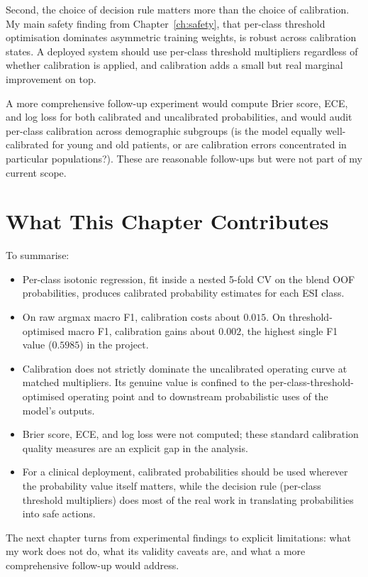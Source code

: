 Second, the choice of decision rule matters more than the choice of calibration. My main safety finding from Chapter~\ref{ch:safety}, that per-class threshold optimisation dominates asymmetric training weights, is robust across calibration states. A deployed system should use per-class threshold multipliers regardless of whether calibration is applied, and calibration adds a small but real marginal improvement on top.

A more comprehensive follow-up experiment would compute Brier score, ECE, and log loss for both calibrated and uncalibrated probabilities, and would audit per-class calibration across demographic subgroups (is the model equally well-calibrated for young and old patients, or are calibration errors concentrated in particular populations?). These are reasonable follow-ups but were not part of my current scope.

\section{What This Chapter Contributes}

To summarise:

\begin{itemize}
 \item Per-class isotonic regression, fit inside a nested 5-fold CV on the blend OOF probabilities, produces calibrated probability estimates for each ESI class.
 \item On raw argmax macro F1, calibration costs about $0.015$. On threshold-optimised macro F1, calibration gains about $0.002$, the highest single F1 value ($0.5985$) in the project.
 \item Calibration does not strictly dominate the uncalibrated operating curve at matched multipliers. Its genuine value is confined to the per-class-threshold-optimised operating point and to downstream probabilistic uses of the model's outputs.
 \item Brier score, ECE, and log loss were not computed; these standard calibration quality measures are an explicit gap in the analysis.
 \item For a clinical deployment, calibrated probabilities should be used wherever the probability value itself matters, while the decision rule (per-class threshold multipliers) does most of the real work in translating probabilities into safe actions.
\end{itemize}

The next chapter turns from experimental findings to explicit limitations: what my work does not do, what its validity caveats are, and what a more comprehensive follow-up would address.
